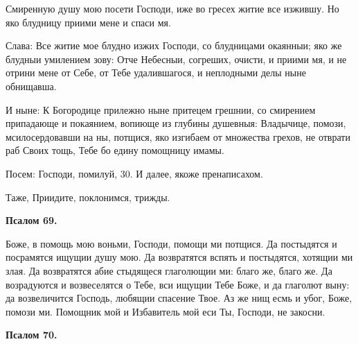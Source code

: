 Смиренную душу мою посети Господи, иже во гресех  житие все изжившу. Но яко  блудницу приими мене и спаси мя.

Слава: Все житие мое блудно изжих Господи, со блудницами окаянныи; яко же блудныи умилением зову: Отче Небесныи, согреших, очисти, и приими мя, и не отрини мене от Себе, от Тебе удалившагося, и неплодными делы ныне обнищавша.

И ныне: К Богородице прилежно ныне притецем грешнии, со смирением припадающе и покаянием, вопиюще из глубины душевныя: Владычице, помози, мсилосердовавши на ны, потщися, яко изгибаем от множества грехов, не отврати раб Своих тощь, Тебе бо едину помощницу имамы.


Посем: Господи, помилуй, 30. И далее, якоже пренаписахом.


Таже, Приидите, поклонимся, трижды.


\medskip


\bfseries Псалом 69.\normalfont{}\nopagebreak


Боже, в помощь мою воньми, Господи, помощи ми потщися. Да постыдятся и посрамятся ищущии душу мою. Да возвратятся вспять и постыдятся, хотящии ми злая. Да возвратятся абие стыдящеся глаголющии ми: благо же, благо же. Да возрадуются и возвеселятся о Тебе, вси ищущии Тебе Боже, и да глаголют выну: да возвеличится Господь, любящии спасение Твое. Аз же нищ есмь и убог, Боже, помози ми. Помощник мой и Избавитель мой еси Ты, Господи, не закосни.


\medskip


\bfseries Псалом 70.\normalfont{}\nopagebreak



